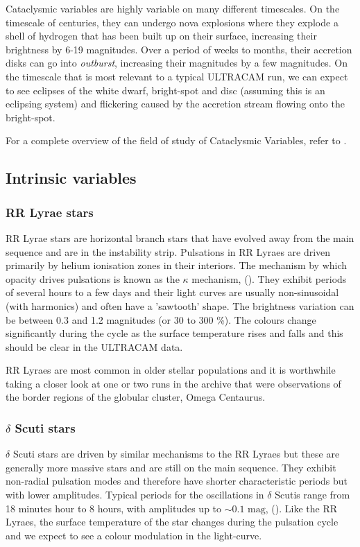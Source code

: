 Cataclysmic variables are highly variable on many different timescales. On the timescale of centuries, they can undergo nova explosions where they explode a shell of hydrogen that has been built up on their surface, increasing their brightness by 6-19 magnitudes. Over a period of weeks to months, their accretion disks can go into \emph{outburst}, increasing their magnitudes by a few magnitudes. On the timescale that is most relevant to a typical ULTRACAM run, we can expect to see eclipses of the white dwarf, bright-spot and disc (assuming this is an eclipsing system) and flickering caused by the accretion stream flowing onto the bright-spot. 

For a complete overview of the field of study of Cataclysmic Variables, refer to \cite{WarnerBook}. 

\subsection{Intrinsic variables}

\subsubsection{RR Lyrae stars}
RR Lyrae stars are horizontal branch stars that have evolved away from the main sequence and are in the instability strip. Pulsations in RR Lyraes are driven primarily by helium ionisation zones in their interiors. The mechanism by which opacity drives pulsations is known as the $\kappa$ mechanism, (\cite{asteroseismology}). They exhibit periods of several hours to a few days and their light curves are usually non-sinusoidal (with harmonics) and often have a 'sawtooth' shape. The brightness variation can be between 0.3 and 1.2 magnitudes (or 30 to 300 \%). The colours change significantly during the cycle as the surface temperature rises and falls and this should be clear in the ULTRACAM data. 

RR Lyraes are most common in older stellar populations and it is worthwhile taking a closer look at one or two runs in the archive that were observations of the border regions of the globular cluster, Omega Centaurus. 

\subsubsection{$\delta$ Scuti stars}
$\delta$ Scuti stars are driven by similar mechanisms to the RR Lyraes but these are generally more massive stars and are still on the main sequence. They exhibit non-radial pulsation modes and therefore have shorter characteristic periods but with lower amplitudes. Typical periods for the oscillations in $\delta$ Scutis range from 18 minutes hour to 8 hours, with amplitudes up to $\sim \mbox{0.1 mag}$, (\cite{KurtzBook}). Like the RR Lyraes, the surface temperature of the star changes during the pulsation cycle and we expect to see a colour modulation in the light-curve. 


